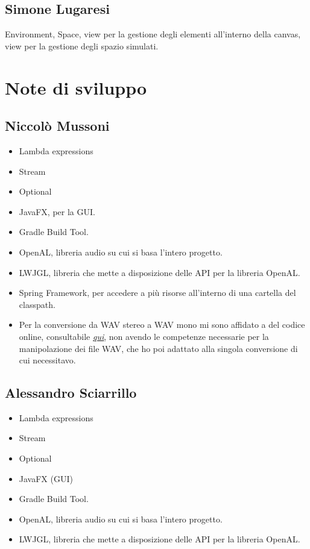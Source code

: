 \documentclass[a4paper,12pt]{report}
\begin{document}
\subsection*{Simone Lugaresi}
Environment, Space, view per la gestione degli elementi all'interno della canvas, view per la gestione degli spazio simulati.
\section{Note di sviluppo}
\subsection*{Niccolò Mussoni}
\begin{itemize}
	\item Lambda expressions
	\item Stream
	\item Optional
	\item JavaFX, per la GUI.
	\item Gradle Build Tool.
	\item OpenAL, libreria audio su cui si basa l’intero progetto.
	\item LWJGL, libreria che mette a disposizione delle API per la libreria OpenAL.
	\item Spring Framework, per accedere a più risorse all'interno di una cartella del classpath.
	\item Per la conversione da WAV stereo a WAV mono mi sono affidato a del codice online, consultabile \textit{\underline{\href{http://www.java2s.com/example/java/javax.sound.sampled/converts-re-samples-and-mono-tofrom-stereo-audio-data.html}{qui}}}, non avendo le competenze necessarie per la manipolazione dei file WAV, che ho poi adattato alla singola conversione di cui necessitavo.
\end{itemize}
\subsection*{Alessandro Sciarrillo}
\begin{itemize}
	\item Lambda expressions
	\item Stream
	\item Optional
	\item JavaFX (GUI)
	\item Gradle Build Tool.
	\item OpenAL, libreria audio su cui si basa l’intero progetto.
	\item LWJGL, libreria che mette a disposizione delle API per la libreria OpenAL.
\end{itemize}
\end{document}
